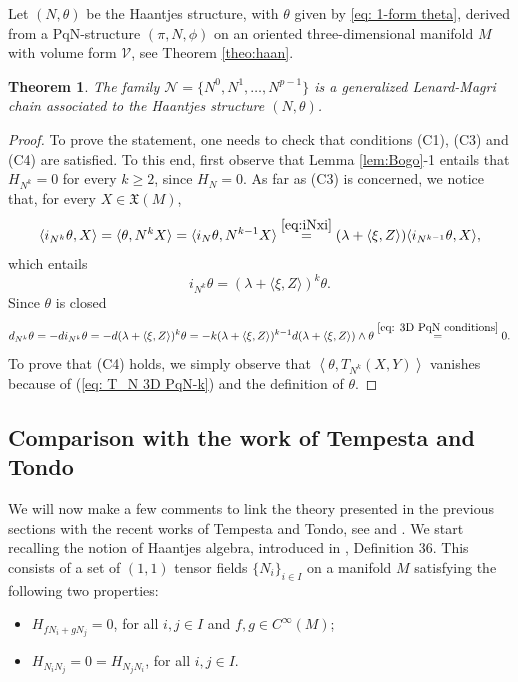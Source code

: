 \documentclass[12pt]{article}
\newtheorem{theorem}{Theorem}%
\newcommand{\blu}[1]{\textcolor{blue}{#1}}
\begin{document}
Let $(N,\theta)$ be the Haantjes structure, with $\theta$ given by \eqref{eq: 1-form theta}, 
derived from a PqN-structure $(\pi,N,\phi)$ on an oriented three-dimensional manifold $M$ 
with volume form $\mathcal{V}$, see Theorem \ref{theo:haan}. 
\begin{theorem}
\label{theo:Len-Ma-Ge} 
The family $\mathcal N=\{N^0,N^1,\dots,N^{p-1}\}$
is a generalized Lenard-Magri chain associated to the Haantjes structure $(N,\theta)$.
\end{theorem} 
\begin{proof}
To prove the statement, one needs to check that conditions (C1), (C3) and (C4) are satisfied. To this end, first observe that Lemma \ref{lem:Bogo}-1 entails that  $H_{N^k}=0$ for every $k\geq 2$, since $H_N=0$.  
As far as (C3) is concerned, 
we notice that, for every $X\in\mathfrak X(M)$,
\[
\langle i_{N^k}\theta,X\rangle=\langle\theta,N^kX\rangle=\langle i_{N}\theta,N^{k-1}X\rangle\stackrel{\eqref{eq:iNxi}}{=}(\lambda+\langle\xi,Z\rangle)\langle i_{N^{k-1}}\theta,X\rangle,
\]
which entails
\begin{equation}
i_{N^k}\theta=(\lambda+\langle\xi,Z\rangle)^k\theta.\label{eq:iNxi1}
\end{equation}
Since $\theta$ is closed 
\[
d_{N^k}\theta=-di_{N^k}\theta=-d(\lambda+\langle\xi,Z\rangle)^k\theta=-k(\lambda+\langle\xi,Z\rangle)^{k-1}d(\lambda+\langle\xi,Z\rangle)\wedge\theta\stackrel{\eqref{eq: 3D PqN conditions}}{=}0.
\]
To prove that (C4) holds, we simply observe that $\left<\theta,T_{N^k}(X,Y)\right>$ vanishes because of (\ref{eq: T_N 3D PqN-k}) and the definition of $\theta$.
\end{proof}


\subsection{Comparison with the work of Tempesta and Tondo}\label{ss:tempton}
We will now make a few comments to link the theory presented in the previous sections with the recent works of Tempesta and Tondo, see \cite{tempestatondoben, tempestatondo, tempestatondohigher,tempestatondoclass} and \cite{TondoLag}. We start recalling %
the notion of Haantjes algebra, %
introduced in \cite{tempestatondo}, %
Definition 36. %
This consists of a set of $(1,1)$ tensor fields $\{N_i\}_{i\in I}$ on a manifold $M$ 
satisfying the following two properties:
\begin{itemize}
\item $H_{fN_i+gN_j}=0$, for all $i,j\in I$ and $f,g\in C^\infty(M)$;
\item $H_{N_iN_j}=0=H_{N_jN_i}$, for all $i,j\in I$.
\end{itemize}
\end{document}
